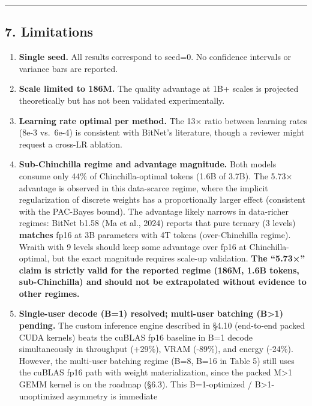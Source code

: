 \begin{center}\rule{0.5\linewidth}{0.5pt}\end{center}

\subsection{7. Limitations}\label{limitations}

\begin{enumerate}
\def\labelenumi{\arabic{enumi}.}
\tightlist
\item
  \textbf{Single seed.} All results correspond to seed=0. No confidence
  intervals or variance bars are reported.
\item
  \textbf{Scale limited to 186M.} The quality advantage at 1B+ scales is
  projected theoretically but has not been validated experimentally.
\item
  \textbf{Learning rate optimal per method.} The 13× ratio between
  learning rates (8e-3 vs.~6e-4) is consistent with BitNet's literature,
  though a reviewer might request a cross-LR ablation.
\item
  \textbf{Sub-Chinchilla regime and advantage magnitude.} Both models
  consume only 44\% of Chinchilla-optimal tokens (1.6B of 3.7B). The
  5.73× advantage is observed in this data-scarce regime, where the
  implicit regularization of discrete weights has a proportionally
  larger effect (consistent with the PAC-Bayes bound). The advantage
  likely narrows in data-richer regimes: BitNet b1.58 (Ma et al., 2024)
  reports that pure ternary (3 levels) \textbf{matches} fp16 at 3B
  parameters with 4T tokens (over-Chinchilla regime). Wraith with 9
  levels should keep some advantage over fp16 at Chinchilla-optimal, but
  the exact magnitude requires scale-up validation. \textbf{The
  ``5.73×'' claim is strictly valid for the reported regime (186M, 1.6B
  tokens, sub-Chinchilla) and should not be extrapolated without
  evidence to other regimes.}
\item
  \textbf{Single-user decode (B=1) resolved; multi-user batching
  (B\textgreater1) pending.} The custom inference engine described in
  §4.10 (end-to-end packed CUDA kernels) beats the cuBLAS fp16 baseline
  in B=1 decode simultaneously in throughput (+29\%), VRAM (-89\%), and
  energy (-24\%). However, the multi-user batching regime (B=8, B=16 in
  Table 5) still uses the cuBLAS fp16 path with weight materialization,
  since the packed M\textgreater1 GEMM kernel is on the roadmap (§6.3).
  This B=1-optimized / B\textgreater1-unoptimized asymmetry is immediate

\end{enumerate}
